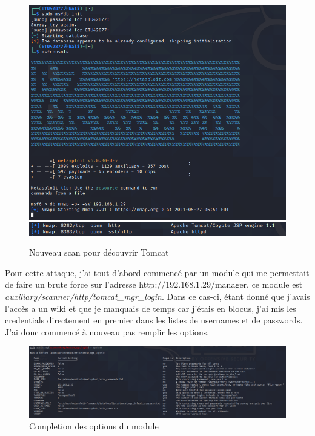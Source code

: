 \documentclass[a4paper]{article}
\begin{document}
\begin{figure}[H]
  \centering
  \includegraphics[width=14cm]{images/Rapport/kali/W2k8/tomcat/1.png}
  \includegraphics[width=17cm]{images/Rapport/kali/W2k8/tomcat/Capture.png}
  \caption{Nouveau scan pour découvrir Tomcat}
\end{figure}

Pour cette attaque, j'ai tout d'abord commencé par un module qui me permettait de faire un brute force sur l'adresse http://192.168.1.29/manager, ce module est \emph{auxiliary/scanner/http/tomcat\_mgr\_login}.
Dans ce cas-ci, étant donné que j'avais l'accès a un wiki et que je manquais de temps car j'étais en blocus, j'ai mis les credentials directement en premier dans les listes de usernames et de passwords.
J'ai donc commencé à nouveau pas remplir les options.

\begin{figure}[H]
  \centering
  \includegraphics[width=14cm]{images/Rapport/kali/W2k8/tomcat/2.png}
  \caption{Completion des options du module}
\end{figure}
\end{document}
